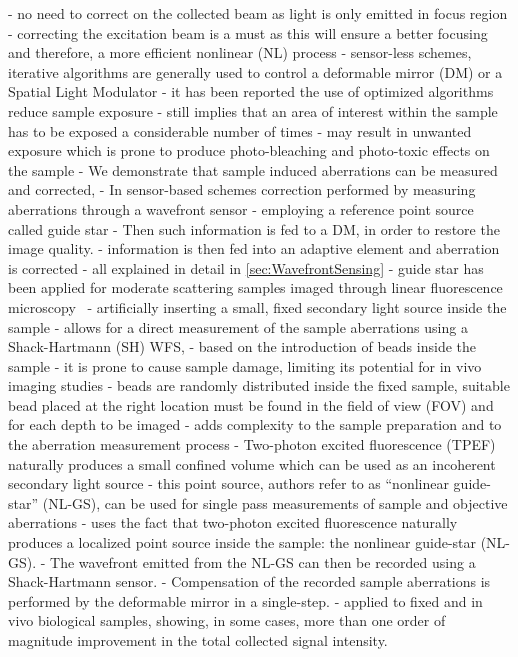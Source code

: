 - no need to correct on the collected beam as light is only emitted in focus region
- correcting the excitation beam is a must as this will ensure a better focusing and therefore, a more efficient nonlinear (NL) process
- sensor-less schemes, iterative algorithms are generally used to control a deformable mirror (DM) or a Spatial Light Modulator 
- it has been reported the use of optimized algorithms reduce sample exposure
- still implies that an area of interest within the sample has to be exposed a considerable number of times
- may result in unwanted exposure which is prone to produce photo-bleaching and photo-toxic effects on the sample
- We demonstrate that sample induced aberrations can be measured and corrected, 
- In sensor-based schemes  correction performed by measuring aberrations through a wavefront sensor 
- employing a reference point source called guide star
- Then such information is fed to a DM, in order to restore the image quality.
- information is then fed into an adaptive element and aberration is corrected 
- all explained in detail in \ref{sec:WavefrontSensing}
- guide star has been applied for moderate scattering samples imaged through linear fluorescence microscopy~\cite{wide_fluorescence_guide_star} 
- artificially inserting a small, fixed secondary light source inside the sample 
- allows for a direct measurement of the sample aberrations using a Shack-Hartmann (SH) WFS,
- based on the introduction of beads inside the sample 
- it is prone to cause sample damage, limiting its potential for in vivo imaging studies
- beads are randomly distributed inside the fixed sample, suitable bead placed at the right location must be found in the field of view (FOV) and for each depth to be imaged
- adds complexity to the sample preparation and to the aberration measurement process
- Two-photon excited fluorescence (TPEF) naturally produces a small confined volume which can be used as an incoherent secondary light source
- this point source, authors refer to as "`nonlinear guide-star"' (NL-GS), can be used for single pass measurements of sample and objective aberrations
- uses the fact that two-photon excited fluorescence naturally produces a localized point source inside the sample: the nonlinear guide-star (NL-GS).
- The wavefront emitted from the NL-GS can then be recorded using a Shack-Hartmann sensor.
- Compensation of the recorded sample aberrations is performed by the deformable mirror in a single-step. 
- applied to fixed and in vivo biological samples, showing, in some cases, more than one order of magnitude improvement in the total collected signal intensity.
